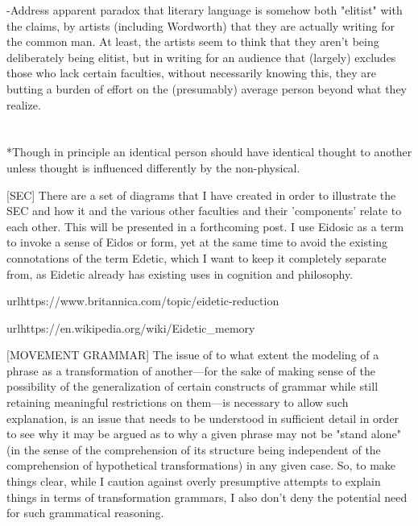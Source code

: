 \documentclass[]{article}
\begin{document}
-Address apparent paradox that literary language is somehow both "elitist" with the claims, by artists (including Wordworth) that they are actually writing for the common man. At least, the artists seem to think that they aren't being deliberately being elitist, but in writing for an audience that (largely) excludes those who lack certain faculties, without necessarily knowing this, they are butting a burden of effort on the (presumably) average person beyond what they realize.



\section{}



*Though in principle an identical person should have identical thought to another unless thought is influenced differently by the non-physical.



[SEC] There are a set of diagrams that I have created in order to illustrate the SEC and how it and the various other faculties and their 'components' relate to each other. This will be presented in a forthcoming post. I use Eidosic as a term to invoke a sense of Eidos or form, yet at the same time to avoid the existing connotations of the term Edetic, which I want to keep it completely separate from, as Eidetic already has existing uses in cognition and philosophy.



url{https://www.britannica.com/topic/eidetic-reduction}

url{https://en.wikipedia.org/wiki/Eidetic_memory}





[MOVEMENT GRAMMAR] The issue of to what extent the modeling of a phrase as a transformation of another—for the sake of making sense of the possibility of the generalization of certain constructs of grammar while still retaining meaningful restrictions on them—is necessary to allow such explanation, is an issue that needs to be understood in sufficient detail in order to see why it may be argued as to why a given phrase may not be "stand alone" (in the sense of the comprehension of its structure being independent of the comprehension of hypothetical transformations) in any given case. So, to make things clear, while I caution against overly presumptive attempts to explain things in terms of transformation grammars, I also don't deny the potential need for such grammatical reasoning.
\end{document}
